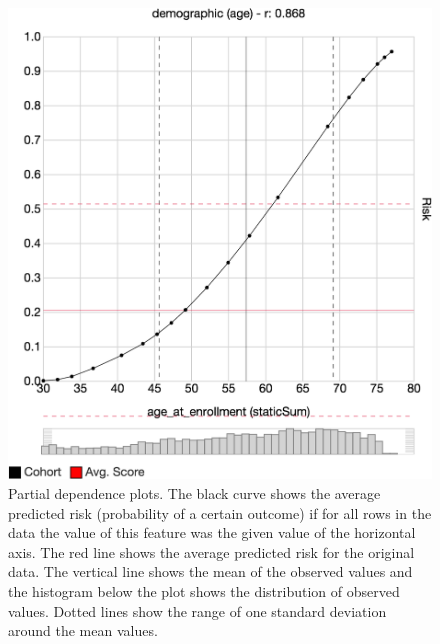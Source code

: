 \begin{figure}[t]
\centering
\includegraphics[width=0.6\linewidth]{prospector/pdp_reg} %
\caption{
Partial dependence plots. The black curve shows the average predicted risk
(probability of a certain outcome) if for all rows in the data the value of this
feature was the given value of the horizontal axis.
The red line shows the average predicted risk for the original data.
The vertical line shows the mean of the observed values and the histogram below the plot
shows the distribution of observed values.
Dotted lines show the range of one standard deviation around the mean values.
}
\label{figs:pdp}
\end{figure}